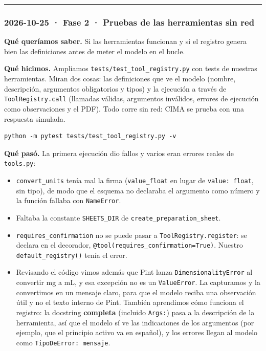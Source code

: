 \begin{center}\rule{0.5\linewidth}{0.5pt}\end{center}

\subsubsection{2026-10-25 · Fase 2 · Pruebas de las herramientas sin red}

\textbf{Qué queríamos saber.} Si las herramientas funcionan y si el registro genera bien las
definiciones antes de meter el modelo en el bucle.

\textbf{Qué hicimos.} Ampliamos \texttt{tests/\allowbreak{}test\_\allowbreak{}tool\_\allowbreak{}registry.py} con tests de nuestras herramientas. Miran
dos cosas: las definiciones que ve el modelo (nombre, descripción, argumentos obligatorios y tipos)
y la ejecución a través de \texttt{ToolRegistry.call} (llamadas válidas, argumentos inválidos, errores de
ejecución como observaciones y el PDF). Todo corre sin red: CIMA se prueba con una respuesta
simulada.

\begin{lstlisting}
python -m pytest tests/test_tool_registry.py -v
\end{lstlisting}

\textbf{Qué pasó.} La primera ejecución dio fallos y varios eran errores reales de \texttt{tools.py}:

\begin{itemize}
\tightlist
\item
  \texttt{convert\_\allowbreak{}units} tenía mal la firma (\texttt{value\_\allowbreak{}float} en lugar de \texttt{value: float}, sin tipo), de modo
  que el esquema no declaraba el argumento como número y la función fallaba con \texttt{NameError}.
\item
  Faltaba la constante \texttt{SHEETS\_\allowbreak{}DIR} de \texttt{create\_\allowbreak{}preparation\_\allowbreak{}sheet}.
\item
  \texttt{requires\_\allowbreak{}confirmation} no se puede pasar a \texttt{ToolRegistry.register}: se declara en el
  decorador, \texttt{@tool(requires\_\allowbreak{}confirmation=\allowbreak{}True)}. Nuestro \texttt{default\_\allowbreak{}registry()} tenía el error.
\item
  Revisando el código vimos además que Pint lanza \texttt{DimensionalityError} al convertir mg a mL, y
  esa excepción no es un \texttt{ValueError}. La capturamos y la convertimos en un mensaje claro, para
  que el modelo reciba una observación útil y no el texto interno de Pint.
  También aprendimos cómo funciona el registro: la docstring \textbf{completa} (incluido \texttt{Args:}) pasa a
  la descripción de la herramienta, así que el modelo sí ve las indicaciones de los argumentos
  (por ejemplo, que el principio activo va en español), y los errores llegan al modelo como
  \texttt{TipoDeError: mensaje}.
\end{itemize}

